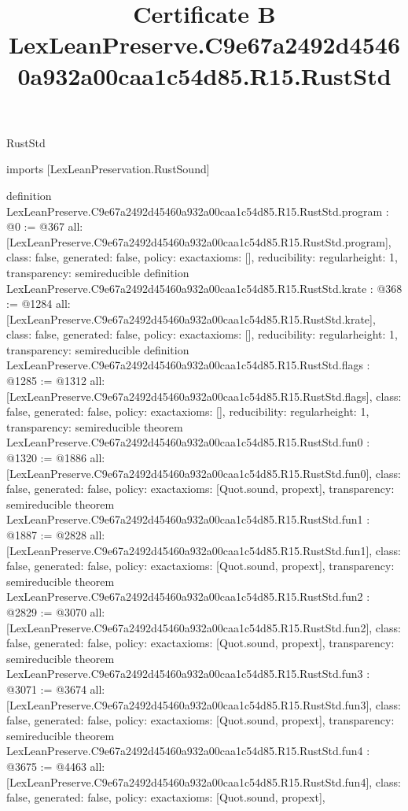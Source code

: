 \begin{lexlean}{RustStd}
\title{Certificate B LexLeanPreserve.C9e67a2492d45460a932a00caa1c54d85.R15.RustStd}
\begin{coremodule}
imports [LexLeanPreservation.RustSound]

definition LexLeanPreserve.C9e67a2492d45460a932a00caa1c54d85.R15.RustStd.program : @0 := @367 {
  all: [LexLeanPreserve.C9e67a2492d45460a932a00caa1c54d85.R15.RustStd.program],
  class: false,
  generated: false,
  policy: exact{axioms: []},
  reducibility: regular{height: 1},
  transparency: semireducible
}
definition LexLeanPreserve.C9e67a2492d45460a932a00caa1c54d85.R15.RustStd.krate : @368 := @1284 {
  all: [LexLeanPreserve.C9e67a2492d45460a932a00caa1c54d85.R15.RustStd.krate],
  class: false,
  generated: false,
  policy: exact{axioms: []},
  reducibility: regular{height: 1},
  transparency: semireducible
}
definition LexLeanPreserve.C9e67a2492d45460a932a00caa1c54d85.R15.RustStd.flags : @1285 := @1312 {
  all: [LexLeanPreserve.C9e67a2492d45460a932a00caa1c54d85.R15.RustStd.flags],
  class: false,
  generated: false,
  policy: exact{axioms: []},
  reducibility: regular{height: 1},
  transparency: semireducible
}
theorem LexLeanPreserve.C9e67a2492d45460a932a00caa1c54d85.R15.RustStd.fun0 : @1320 := @1886 {
  all: [LexLeanPreserve.C9e67a2492d45460a932a00caa1c54d85.R15.RustStd.fun0],
  class: false,
  generated: false,
  policy: exact{axioms: [Quot.sound, propext]},
  transparency: semireducible
}
theorem LexLeanPreserve.C9e67a2492d45460a932a00caa1c54d85.R15.RustStd.fun1 : @1887 := @2828 {
  all: [LexLeanPreserve.C9e67a2492d45460a932a00caa1c54d85.R15.RustStd.fun1],
  class: false,
  generated: false,
  policy: exact{axioms: [Quot.sound, propext]},
  transparency: semireducible
}
theorem LexLeanPreserve.C9e67a2492d45460a932a00caa1c54d85.R15.RustStd.fun2 : @2829 := @3070 {
  all: [LexLeanPreserve.C9e67a2492d45460a932a00caa1c54d85.R15.RustStd.fun2],
  class: false,
  generated: false,
  policy: exact{axioms: [Quot.sound, propext]},
  transparency: semireducible
}
theorem LexLeanPreserve.C9e67a2492d45460a932a00caa1c54d85.R15.RustStd.fun3 : @3071 := @3674 {
  all: [LexLeanPreserve.C9e67a2492d45460a932a00caa1c54d85.R15.RustStd.fun3],
  class: false,
  generated: false,
  policy: exact{axioms: [Quot.sound, propext]},
  transparency: semireducible
}
theorem LexLeanPreserve.C9e67a2492d45460a932a00caa1c54d85.R15.RustStd.fun4 : @3675 := @4463 {
  all: [LexLeanPreserve.C9e67a2492d45460a932a00caa1c54d85.R15.RustStd.fun4],
  class: false,
  generated: false,
  policy: exact{axioms: [Quot.sound, propext]},
}
\end{coremodule}
\end{lexlean}
